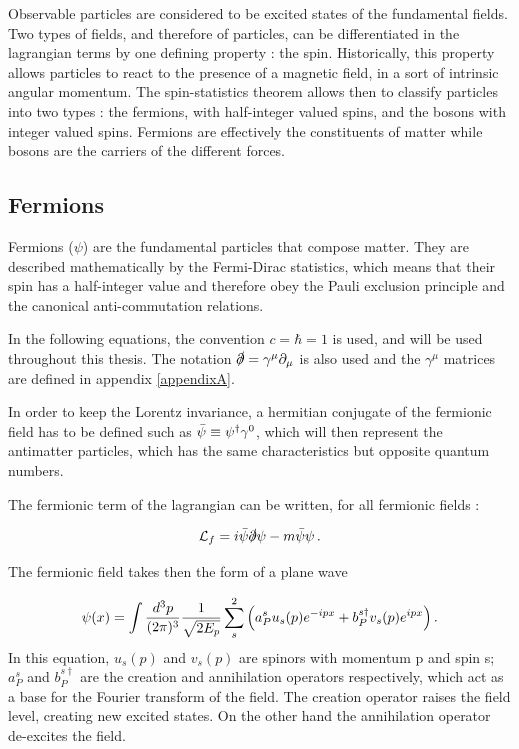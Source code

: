 Observable particles are considered to be excited states of the fundamental fields. Two types of fields, and therefore of particles, can be differentiated in the lagrangian terms by one defining property : the spin. Historically, this property allows particles to react to the presence of a magnetic field, in a sort of intrinsic angular momentum. The spin-statistics theorem allows then to classify particles into two types : the fermions, with half-integer valued spins, and the bosons with integer valued spins. Fermions are effectively the constituents of matter while bosons are the carriers of the different forces.

\subsection{Fermions}

Fermions ($\psi$) are the fundamental particles that compose matter. They are described mathematically by the Fermi-Dirac statistics, which means that their spin has a half-integer value and therefore obey the Pauli exclusion principle and the canonical anti-commutation relations.

In the following equations, the convention $c = \hbar = 1$ is used, and will be used throughout this thesis. The notation $\slashed{\partial} = \gamma^{\mu}\partial_{\mu}$ is also used and the $\gamma^{\mu}$ matrices are defined in appendix \ref{appendixA}. \newline

In order to keep the Lorentz invariance, a hermitian conjugate of the fermionic field has to be defined such as $\Bar{\psi} \equiv \psi^{\dagger}\gamma^0$, which will then represent the antimatter particles, which has the same characteristics but opposite quantum numbers.\newline

The fermionic term of the lagrangian can be written, for all fermionic fields :

\begin{equation}
    \Lagr_f = i\Bar{\psi}\slashed{\partial}\psi - m\Bar{\psi}\psi \mend
    \label{eq:free_fermion}
\end{equation}

The fermionic field takes then the form of a plane wave 

\begin{equation}
    \psi(x) = \int \frac{d^3 p}{(2\pi)^3} \frac{1}{\sqrt{2E_p}} \sum^{2}_{s} \Big( a^{s}_{P} u_s (p)e^{-ipx} + b^{s\dagger}_P v_s (p)e^{ipx} \Big) \mend
\end{equation}
In this equation, $u_s (p)$ and $v_s (p)$ are spinors with momentum p and spin s; $a^{s}_P$ and $b^{s\dagger}_P$ are the creation and annihilation operators respectively, which act as a base for the Fourier transform of the field. The creation operator raises the field level, creating new excited states. On the other hand the annihilation operator de-excites the field.

